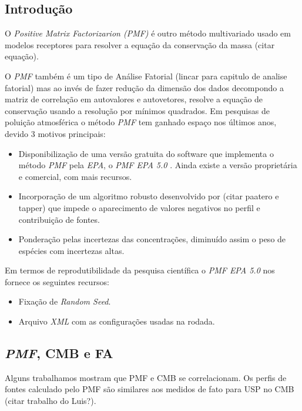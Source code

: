 \subsection{Introdução}
O \textit{Positive Matrix Factorizarion (PMF)} é outro método multivariado usado
em modelos receptores para resolver a equação da conservação da massa 
(citar equação). 

O \textit{PMF} também é um tipo de Análise Fatorial (lincar para capitulo de analise fatorial)
mas ao invés de fazer redução da dimensão dos dados decompondo a matriz de 
correlação em autovalores e autovetores, resolve a equação de conservação 
usando a resolução por mínimos quadrados. Em pesquisas de poluição atmosférica 
o método \textit{PMF} tem ganhado espaço nos últimos anos, devido 3 motivos 
principais:

\begin{itemize}
  \item Disponibilização de uma versão gratuita do software que implementa 
        o método \textit{PMF} pela \textit{EPA}, o \textit{PMF EPA 5.0} 
        \citep{Norris:2014}. 
        Ainda existe a versão proprietária e comercial, com mais recursos.   
  \item Incorporação de um algoritmo robusto desenvolvido por (citar paatero e tapper) 
        que impede o aparecimento de valores negativos no perfil e 
        contribuição de fontes.
  \item Ponderação pelas incertezas das concentrações, diminuído assim o peso 
        de espécies com incertezas altas.
\end{itemize}  

Em termos de reprodutibilidade da pesquisa científica o \textit{PMF EPA 5.0} 
nos fornece os seguintes recursos:

\begin{itemize}
  \item Fixação de \textit{Random Seed}.
  \item Arquivo \textit{XML} com as configurações usadas na rodada. 
\end{itemize} 

\subsection{\textit{PMF}, CMB e FA}

Alguns trabalhamos mostram que PMF e CMB se correlacionam. 
Os perfis de fontes calculado pelo PMF são similares aos medidos de fato para 
USP no CMB (citar trabalho do Luis?). 


